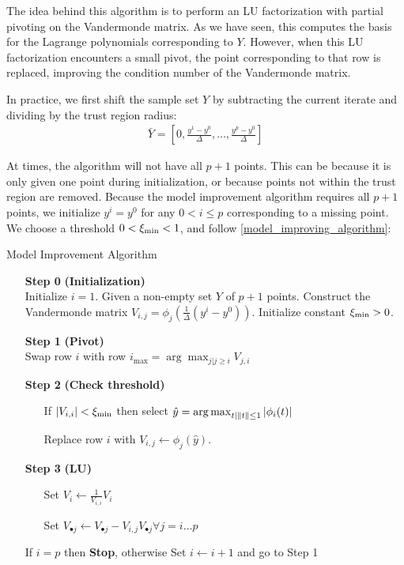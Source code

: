 The idea behind this algorithm is to perform an LU factorization with partial pivoting on the Vandermonde matrix.
As we have seen, this computes the basis for the Lagrange polynomials corresponding to $Y$.
However, when this LU factorization encounters a small pivot, the point corresponding to that row is replaced, improving the condition number of the Vandermonde matrix.

In practice, we first shift the sample set $Y$ by subtracting the current iterate and dividing by the trust region radius:
\begin{align}
\bar{Y} = [0, \frac{y^1 - y^0}{\Delta}, \ldots, \frac{y^p - y^0}{\Delta}]
\end{align}

At times, the algorithm will not have all $p+1$ points.
This can be because it is only given one point during initialization, or because points not within the trust region are removed.
Because the model improvement algorithm requires all $p+1$ points, we initialize $y^i = y^0$ for any $0 < i \le p$ corresponding to a missing point.
We choose a threshold $0 < \xi_{\text{min}} < 1$, and follow \cref{model_improving_algorithm}:

\begin{algorithm}[H]
    \caption{Model Improvement Algorithm}
    \label{model_improving_algorithm}
    \begin{itemize}
        \item[\textbf{Step 0}] \textbf{(Initialization)} \\
            Initialize $i=1$.
            Given a non-empty set $Y$ of $p+1$ points. 
            Construct the Vandermonde matrix $V_{i,j} = \phi_j(\frac 1 {\Delta}(y^i - y^0))$.
			Initialize constant $\xi_{\text{min}} > 0$.
        \item[\textbf{Step 1}] \textbf{(Pivot)} \\
            Swap row $i$ with row $i_{\max} = \arg \max_{j|j\ge i} V_{j,i} $
        
        \item[\textbf{Step 2}] \textbf{(Check threshold)} \begin{itemize}
                \item[] If $|V_{i,i}| < \xi_{\text{min}}$ then select \label{next_point} $\hat y = \operatorname*{arg\,max}_{t | \|t\|\le 1} |\phi_i(t)|$
                \item[] Replace row $i$ with $V_{i, j} \gets \phi_j(\hat y)$.
            \end{itemize}
        
        \item[\textbf{Step 3}] \textbf{(LU)} \begin{itemize}
                \item[] Set $V_i \gets \frac{1}{V_{i,i}} V_i$
                \item[] Set $V_{\bullet j} \gets V_{\bullet j} - V_{i,j} V_{\bullet j} \forall j=i \ldots p$
            \end{itemize}
            If $i = p$ then \textbf{Stop}, otherwise Set $i \gets i+1$ and go to Step 1
    \end{itemize}
\end{algorithm}


